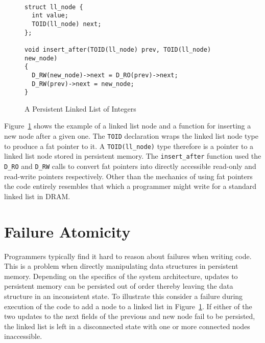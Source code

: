 \documentclass[twocolumn]{article}
\begin{document}
\begin{figure}
{ \scriptsize
\begin{verbatim}

struct ll_node {
  int value;
  TOID(ll_node) next;
};

void insert_after(TOID(ll_node) prev, TOID(ll_node) new_node)
{
  D_RW(new_node)->next = D_RO(prev)->next;
  D_RW(prev)->next = new_node;
}

\end{verbatim}
}
\caption{A Persistent Linked List of Integers}
\label{fig:example}
\end{figure}

Figure~\ref{fig:example} shows the example of a linked list node and a function
for inserting a new node after a given one. The {\tt TOID} declaration wraps the
linked list node type to produce a fat pointer to it. A {\tt TOID(ll\_node)}
type therefore is a pointer to a linked list node stored in persistent memory.
The {\tt insert\_after} function used the {\tt D\_RO} and {\tt D\_RW} calls to
convert fat pointers into directly accessible read-only and read-write pointers
respectively. Other than the mechanics of using fat pointers the code entirely
resembles that which a programmer might write for a standard linked list in
DRAM.

\section{Failure Atomicity}
Programmers typically find it hard to reason about failures when writing
code. This is a problem when directly manipulating data structures in persistent
memory. Depending on the specifics of the system architecture, updates to
persistent memory can be persisted out of order thereby leaving the data
structure in an inconsistent state. To illustrate this consider a failure during
execution of the code to add a node to a linked list in
Figure~\ref{fig:example}. If either of the two updates to the next fields of the
previous and new node fail to be persisted, the linked list is left in a
disconnected state with one or more connected nodes inaccessible.
\end{document}
